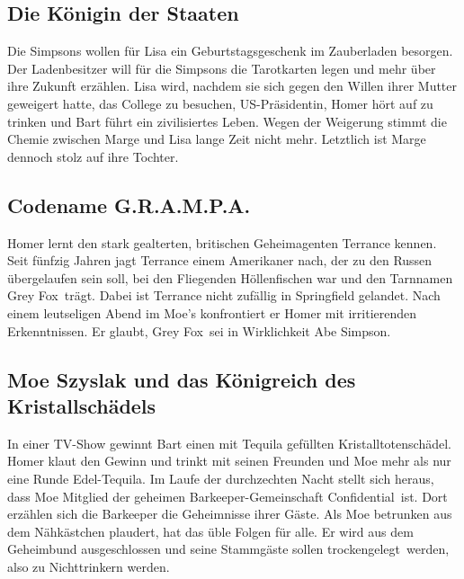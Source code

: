\subsection{Die Königin der Staaten}
Die Simpsons wollen für Lisa ein Geburtstagsgeschenk im Zauberladen besorgen. Der Ladenbesitzer will für die Simpsons die Tarotkarten legen und mehr über ihre Zukunft erzählen. Lisa wird, nachdem sie sich gegen den Willen ihrer Mutter geweigert hatte, das College zu besuchen, US-Präsidentin, Homer hört auf zu trinken und Bart führt ein zivilisiertes Leben. Wegen der Weigerung stimmt die Chemie zwischen Marge und Lisa lange Zeit nicht mehr. Letztlich ist Marge dennoch stolz auf ihre Tochter.


\subsection{Codename G.R.A.M.P.A.}
Homer lernt den stark gealterten, britischen Geheimagenten Terrance kennen. Seit fünfzig Jahren jagt Terrance einem Amerikaner nach, der zu den Russen übergelaufen sein soll, bei den Fliegenden Höllenfischen war und den Tarnnamen \glqq Grey Fox\grqq\ trägt. Dabei ist Terrance nicht zufällig in Springfield gelandet. Nach einem leutseligen Abend im Moe's konfrontiert er Homer mit irritierenden Erkenntnissen. Er glaubt, \glqq Grey Fox\grqq\ sei in Wirklichkeit Abe Simpson.


\subsection{Moe Szyslak und das Königreich des Kristallschädels}\label{QABF15}
In einer TV-Show gewinnt Bart einen mit Tequila gefüllten Kristalltotenschädel. Homer klaut den Gewinn und trinkt mit seinen Freunden und Moe mehr als nur eine Runde Edel-Tequila. Im Laufe der durchzechten Nacht stellt sich heraus, dass Moe Mitglied der geheimen Barkeeper-Gemeinschaft \glqq Confidential\grqq\ ist. Dort erzählen sich die Barkeeper die Geheimnisse ihrer Gäste. Als Moe betrunken aus dem Nähkästchen plaudert, hat das üble Folgen für alle. Er wird aus dem Geheimbund ausgeschlossen und seine Stammgäste sollen \glqq trockengelegt\grqq\ werden, also zu Nichttrinkern werden.

